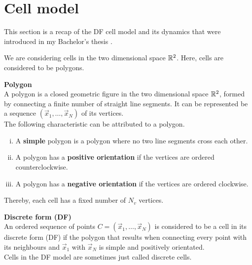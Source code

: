 \section{Cell model} 

This section is a recap of the DF cell model and its dynamics that were introduced in my Bachelor's thesis \cite{Vogel2023}.

We are considering cells in the two dimensional space $\mathbb{R}^2$. Here, cells are considered to be polygons. 

\begin{definition} \textbf{Polygon} \\
	A polygon is a closed geometric figure in the two dimensional space $\mathbb{R}^2$, formed by connecting a finite number of straight line segments. It can be represented be a sequence $(\vec{x}_1, \ldots, \vec{x}_N)$ of its vertices. \\
	The following characteristic can be attributed to a polygon.
	\begin{enumerate}[(i)]
		\item A \textbf{simple} polygon is a polygon where no two line segments cross each other.
		\item A polygon has a \textbf{positive orientation} if the vertices are ordered counterclockwise.
		\item A polygon has a \textbf{negative orientation} if the vertices are ordered clockwise.
	\end{enumerate}
\end{definition}

Thereby, each cell has a fixed number of $N_{v}$ vertices. 


\begin{definition} \textbf{Discrete form (DF)} \label{def:DF}  \\
	An ordered sequence of points $C = (\vec{x}_1, \ldots , \vec{x}_N)$ is considered to be a cell in its discrete form (DF) if the polygon that results when connecting every point with its neighbours and $\vec{x}_1$ with $\vec{x}_N$ is simple and positively orientated. \\	
	Cells in the DF model are sometimes just called discrete cells. \\
\end{definition}








